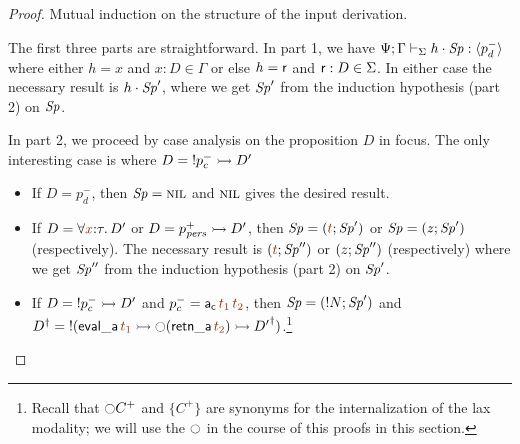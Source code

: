 \begin{proof}
Mutual induction on the structure of the input derivation.

The first three parts are straightforward. In part 1, we have
${\Psi}; {\Gamma} \vdash_{\Sigma} {{h} \cdot {{\it Sp}}} : {\langle {p^-_d} \rangle}$ where
either $h = x$ and $x{:}D \in \Gamma$ or else $h = {\sf r}$ and ${\sf
  r} : D \in \Sigma$. In either case the necessary result is
${h} \cdot {{\it Sp}'}$, where we get ${\it Sp}'$ from the induction hypothesis
(part 2) on ${\it Sp}$.

In part 2, we proceed by case analysis on the proposition $D$ in focus. 
The only interesting case is where $D = {!}p^-_c \rightarrowtail D'$
\smallskip
\begin{itemize}
\item If $D = p_d^-$, then ${\it Sp} = \textsc{nil}$ and $\textsc{nil}$ gives the desired result.

\item If $D = \forall \lf{x}{:}\tau.\,D'$ or $D = p^+_{\it pers} \rightarrowtail D'$, then $\Sp = (\lf{t}; \Sp')$ 
  or ${\it Sp} = (z; {\it Sp}')$ (respectively). The necessary result is
  $(\lf{t}; {\Sp''})$ 
  or $({z}; {{\it Sp}''})$ (respectively) where we get ${\it Sp}''$ from the
  induction hypothesis (part 2) on ${\it Sp}'$. 

\item If $D = {!}p^-_c \rightarrowtail D'$ and $p^-_c = {\sf a_c}\,\lf{t_1}\,\lf{t_2}$, 
  then 
  ${\it Sp} = ({!}{N};{{\it Sp}'})$
  and $\opsubst{D} = {!}({\sf eval\_a}\,\lf{t_1} \lefti {\ocircle}({\sf retn\_a}\,\lf{t_2}) \lefti \opsubst{D'})$.\footnote{Recall that ${\ocircle}C^+$ and $\{ C^+ \}$ are synonyms for the internalization of the lax modality; we will use the ${\ocircle}$ in the course of this proofs in this section.}


\end{itemize}
\end{proof}
